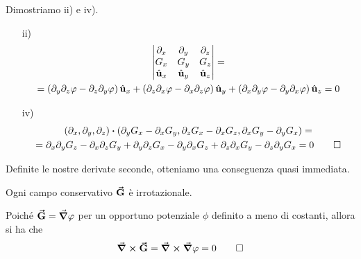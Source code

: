 \begin{demonstration}
	Dimostriamo ii) e iv).
	\begin{itemize}
		\item[ii)]
		\begin{multline*}
			\begin{vmatrix}
				\partial_x & \partial_y & \partial_z\\
				G_x & G_y & G_z\\
				\hat{\mathbf{u}}_x & \hat{\mathbf{u}}_y & \hat{\mathbf{u}}_z
			\end{vmatrix}=\\
		=\left(\partial_y\partial_z\varphi-\partial_z\partial_y\varphi\right)\hat{\mathbf{u}}_x+\left(\partial_z\partial_x\varphi-\partial_x\partial_z\varphi\right)\hat{\mathbf{u}}_y+\left(\partial_x\partial_y\varphi-\partial_y\partial_x\varphi\right)\hat{\mathbf{u}}_z=0
		\end{multline*}
		\item[iv)]
		\begin{multline*}
			\left(\partial_x,\partial_y,\partial_z\right)\vdot(\partial_yG_x-\partial_xG_y,\partial_zG_x-\partial_xG_z,\partial_xG_y-\partial_yG_x)=\\
			=\partial_x\partial_yG_z-\partial_x\partial_zG_y+\partial_y\partial_zG_x-\partial_y\partial_xG_z+\partial_z\partial_xG_y-\partial_z\partial_yG_x=0\qedhere
		\end{multline*}
	\end{itemize}
\end{demonstration}
Definite le nostre derivate seconde, otteniamo una conseguenza quasi immediata.
\begin{proposition}
	Ogni campo conservativo $\vb*{\va{G}}$ è irrotazionale.
\end{proposition}
\begin{demonstration}
	Poiché $\vb*{\va{G}}=\grad{\varphi}$ per un opportuno potenziale $\phi$ definito a meno di costanti, allora si ha che
	\begin{equation*}
		\curl{\vb*{\va{G}}}=\curl{\grad{\varphi}}=0\qedhere
	\end{equation*}
\end{demonstration}
